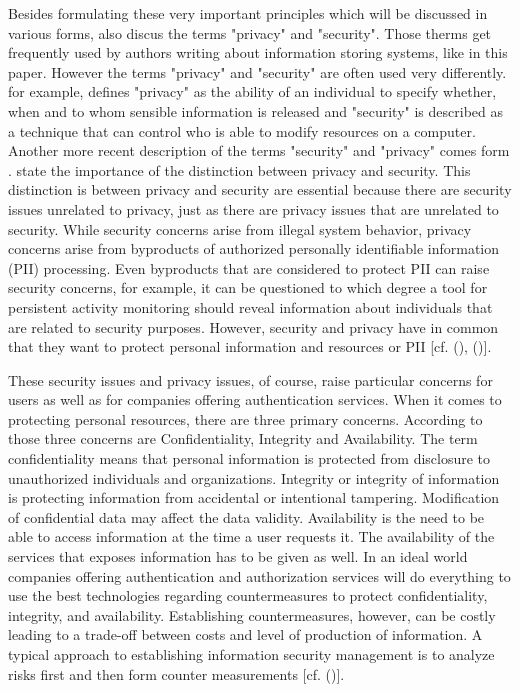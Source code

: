 Besides formulating these very important principles which will be discussed in various forms, \cite{Saltzer:PICS} also discus the terms "privacy" and "security". Those therms get frequently used by authors writing about information storing systems, like in this paper. However the terms "privacy" and "security" are often used very differently. \cite{Saltzer:PICS} for example, defines "privacy" as the ability of an individual to specify whether, when and to whom sensible information is released and "security" is described as a technique that can control who is able to modify resources on a computer. Another more recent description of the terms "security" and "privacy" comes form \cite{Brooks:2017:IPE}. \cite{Brooks:2017:IPE} state the importance of the distinction between privacy and security. This distinction is between privacy and security are essential because there are security issues unrelated to privacy, just as there are privacy issues that are unrelated to security. While security concerns arise from illegal system behavior, privacy concerns arise from byproducts of authorized personally identifiable information (PII) processing. Even byproducts that are considered to protect PII can raise security concerns, for example, it can be questioned to which degree a tool for persistent activity monitoring should reveal information about individuals that are related to security purposes. However, security and privacy have in common that they want to protect personal information and resources or PII [cf. (\cite{Brooks:2017:IPE}), (\cite{Saltzer:PICS})].

These security issues and privacy issues, of course, raise particular concerns for users as well as for companies offering authentication services. When it comes to protecting personal resources, there are three primary concerns. According to \cite{Todorov:2007:MUI} those three concerns are Confidentiality, Integrity and Availability. The term confidentiality means that personal information is protected from 
disclosure to unauthorized individuals and organizations. Integrity or integrity of information is protecting information from accidental or intentional tampering. Modification of confidential data may affect the data validity. Availability is the need to be able to access information at the time a user requests it. The availability of the services that exposes information has to be given as well. In an ideal world companies offering authentication and authorization services will do everything to use the best technologies regarding countermeasures to protect confidentiality, integrity, and availability. Establishing countermeasures, however, can be costly leading to a trade-off between costs and level of production of information. A typical approach to establishing information security management is to analyze risks first and then form counter measurements [cf. (\cite{Todorov:2007:MUI})]. 

